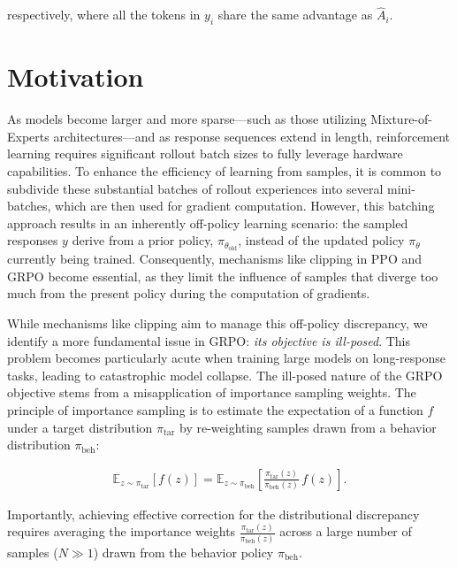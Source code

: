 respectively, where all the tokens in $y_i$ share the same advantage as $\widehat{A}_{i}$.

\section{Motivation}
\label{sec:motivation}

As models become larger and more sparse—such as those utilizing Mixture-of-Experts architectures—and as response sequences extend in length, reinforcement learning requires significant rollout batch sizes to fully leverage hardware capabilities. To enhance the efficiency of learning from samples, it is common to subdivide these substantial batches of rollout experiences into several mini-batches, which are then used for gradient computation. However, this batching approach results in an inherently off-policy learning scenario: the sampled responses $y$ derive from a prior policy, $\pi_{\theta_\text{old}}$, instead of the updated policy $\pi_\theta$ currently being trained. Consequently, mechanisms like clipping in PPO and GRPO become essential, as they limit the influence of samples that diverge too much from the present policy during the computation of gradients.

While mechanisms like clipping aim to manage this off-policy discrepancy, we identify a more fundamental issue in GRPO: \textit{its objective is ill-posed}. This problem becomes particularly acute when training large models on long-response tasks, leading to catastrophic model collapse. The ill-posed nature of the GRPO objective stems from a misapplication of importance sampling weights. The principle of importance sampling is to estimate the expectation of a function $f$ under a target distribution $\pi_\text{tar}$ by re-weighting samples drawn from a behavior distribution $\pi_\text{beh}$:

\begin{align}
\mathbb{E}_{z \sim \pi_\text{tar}} \left[ f(z) \right] = \mathbb{E}_{z \sim \pi_\text{beh}} \left[ \frac{ \pi_\text{tar} (z) }{ \pi_\text{beh} (z)} \, f(z) \right].
\end{align}

Importantly, achieving effective correction for the distributional discrepancy requires averaging the importance weights $\frac{ \pi_\text{tar} (z) }{ \pi_\text{beh} (z)}$ across a large number of samples ($N \gg 1$) drawn from the behavior policy $\pi_\text{beh}$.

